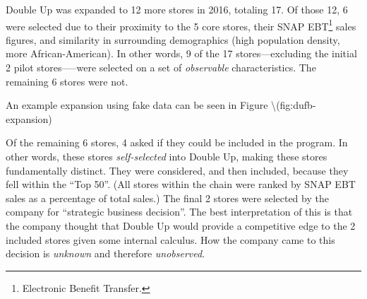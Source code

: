 \documentclass[11pt,letterpaperpaper,]{book}
\let\rmarkdownfootnote\footnote%
\def\footnote{\protect\rmarkdownfootnote}
\begin{document}
Double Up was expanded to 12 more stores in 2016, totaling 17. Of those
12, 6 were selected due to their proximity to the 5 core stores, their
SNAP EBT\footnote{Electronic Benefit Transfer.} sales figures, and
similarity in surrounding demographics (high population density, more
African-American). In other words, 9 of the 17 stores---excluding the
initial 2 pilot stores-----were selected on a set of \emph{observable}
characteristics. The remaining 6 stores were not.

An example expansion using fake data can be seen in Figure
\textbackslash{}\citet{ref}(fig:dufb-expansion)

Of the remaining 6 stores, 4 asked if they could be included in the
program. In other words, these stores \emph{self-selected} into Double
Up, making these stores fundamentally distinct. They were considered,
and then included, because they fell within the ``Top 50''. (All stores
within the chain were ranked by SNAP EBT sales as a percentage of total
sales.) The final 2 stores were selected by the company for ``strategic
business decision''. The best interpretation of this is that the company
thought that Double Up would provide a competitive edge to the 2
included stores given some internal calculus. How the company came to
this decision is \emph{unknown} and therefore \emph{unobserved}.
\end{document}
